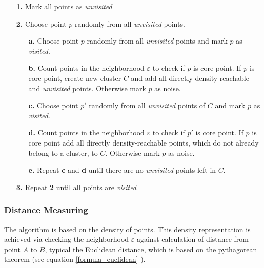 \documentclass[a4paper,headsepline,footsepline,fontsize=11pt,BCOR=12mm,DIV=12]{report}
\begin{document}
\begin{itemize}
	\item[\textbf{1.}] Mark all points as \textit{unvisited}
	\item[\textbf{2.}] Choose point $p$ randomly from all \textit{unvisited} points.
	\begin{itemize}
		\item[\textbf{a.}] Choose point $p$ randomly from all \textit{unvisited} points and mark $p$ as \textit{visited}.
		\item[\textbf{b.}] Count points in the neighborhood $\varepsilon$ to check if $p$ is core point. If $p$ is core point, create new cluster $C$ and add all directly density-reachable and \textit{unvisited} points. Otherwise mark $p$ as noise.
		\item[\textbf{c.}] Choose point $p'$ randomly from all \textit{unvisited} points of $C$ and mark $p$ as \textit{visited}.
		\item[\textbf{d.}] Count points in the neighborhood $\varepsilon$ to check if $p'$ is core point. If $p$ is core point add all directly density-reachable points, which do not already belong to a cluster, to $C$. Otherwise mark $p$ as noise.
		\item[\textbf{e.}] Repeat \textbf{c} and \textbf{d} until there are no \textit{unvisited} points left in $C$.	
	\end{itemize} 
	\item[\textbf{3.}] Repeat \textbf{2} until all points are \textit{visited} 
\end{itemize}


\subsubsection{Distance Measuring}
The algorithm is based on the density of points. This density representation is achieved via checking the neighborhood $\varepsilon$ against calculation of distance from point $A$ to $B$, typical the Euclidean distance, which is based on the pythagorean theorem (see equation \ref{formula_euclidean} \cite{Erhard2020}).
\end{document}
